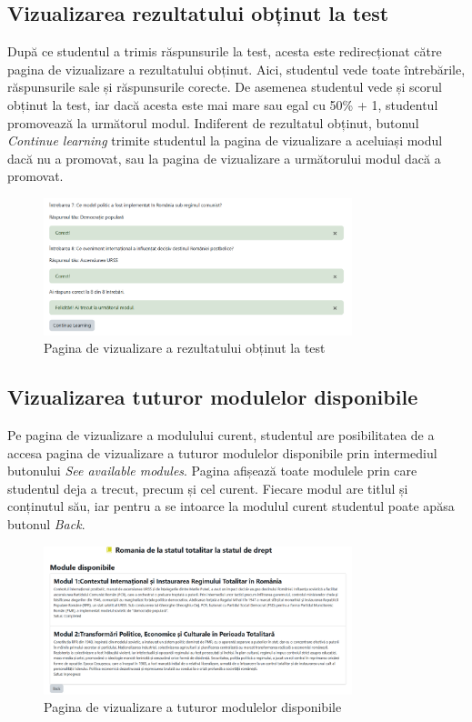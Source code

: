 \subsection{Vizualizarea rezultatului obținut la test}
După ce studentul a trimis răspunsurile la test, acesta este redirecționat către pagina de vizualizare a rezultatului obținut. Aici, studentul vede toate întrebările, răspunsurile sale și 
răspunsurile corecte. De asemenea studentul vede și scorul obținut la test, iar dacă acesta este mai mare sau egal cu 50\% + 1, studentul promovează la următorul modul. Indiferent de 
rezultatul obținut, butonul \textit{Continue learning} trimite studentul la pagina de vizualizare a aceluiași modul dacă nu a promovat, sau la pagina de vizualizare a următorului 
modul dacă a promovat.
\begin{figure}[H]
    \centering
    \includegraphics[width=0.8\textwidth]{images/resultPage.png}
    \caption{Pagina de vizualizare a rezultatului obținut la test}
    \label{fig:pagina_rezultat_test}
\end{figure}
\subsection{Vizualizarea tuturor modulelor disponibile}
Pe pagina de vizualizare a modulului curent, studentul are posibilitatea de a accesa pagina de vizualizare a tuturor modulelor disponibile prin intermediul butonului 
\textit{See available modules}. Pagina afișează toate modulele prin care studentul deja a trecut, precum și cel curent. Fiecare modul are titlul și conținutul său, iar pentru a se intoarce 
la modulul curent studentul poate apăsa butonul \textit{Back}.
\begin{figure}[H]
    \centering
    \includegraphics[width=0.8\textwidth]{images/allModulesPage.png}
    \caption{Pagina de vizualizare a tuturor modulelor disponibile}
    \label{fig:pagina_vezi_module}
\end{figure}
